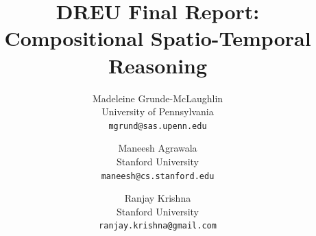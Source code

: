 \documentclass[10pt,twocolumn,letterpaper]{article}
\begin{document}
\title{DREU Final Report: Compositional Spatio-Temporal Reasoning}

\author{Madeleine Grunde-McLaughlin\\
University of Pennsylvania\\
{\tt\small mgrund@sas.upenn.edu}
\and
Maneesh Agrawala\\
Stanford University\\
{\tt\small maneesh@cs.stanford.edu}


\and
Ranjay Krishna\\
Stanford University\\
{\tt\small ranjay.krishna@gmail.com}
}
\maketitle
\pagestyle{empty}
\end{document}
